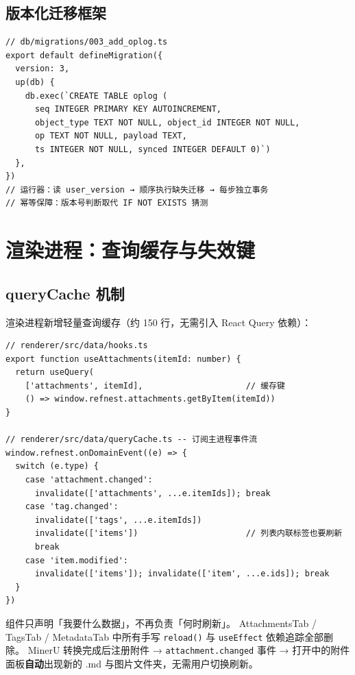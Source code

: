 \documentclass[12pt, a4paper]{article}
\begin{document}
\subsection{版本化迁移框架}

\begin{lstlisting}[language={}]
// db/migrations/003_add_oplog.ts
export default defineMigration({
  version: 3,
  up(db) {
    db.exec(`CREATE TABLE oplog (
      seq INTEGER PRIMARY KEY AUTOINCREMENT,
      object_type TEXT NOT NULL, object_id INTEGER NOT NULL,
      op TEXT NOT NULL, payload TEXT,
      ts INTEGER NOT NULL, synced INTEGER DEFAULT 0)`)
  },
})
// 运行器：读 user_version → 顺序执行缺失迁移 → 每步独立事务
// 幂等保障：版本号判断取代 IF NOT EXISTS 猜测
\end{lstlisting}

\section{渲染进程：查询缓存与失效键}

\subsection{queryCache 机制}

渲染进程新增轻量查询缓存（约 150 行，无需引入 React Query 依赖）：

\begin{lstlisting}[language={}]
// renderer/src/data/hooks.ts
export function useAttachments(itemId: number) {
  return useQuery(
    ['attachments', itemId],                     // 缓存键
    () => window.refnest.attachments.getByItem(itemId))
}

// renderer/src/data/queryCache.ts -- 订阅主进程事件流
window.refnest.onDomainEvent((e) => {
  switch (e.type) {
    case 'attachment.changed':
      invalidate(['attachments', ...e.itemIds]); break
    case 'tag.changed':
      invalidate(['tags', ...e.itemIds])
      invalidate(['items'])                      // 列表内联标签也要刷新
      break
    case 'item.modified':
      invalidate(['items']); invalidate(['item', ...e.ids]); break
  }
})
\end{lstlisting}

\begin{tcolorbox}[fixbox, title={对策 \#2：解决「各组件手动 reload」}]
  组件只声明「我要什么数据」，不再负责「何时刷新」。
  AttachmentsTab / TagsTab / MetadataTab 中所有手写 \texttt{reload()}
  与 \texttt{useEffect} 依赖追踪全部删除。
  MinerU 转换完成后注册附件 → \texttt{attachment.changed} 事件 →
  打开中的附件面板\textbf{自动}出现新的 .md 与图片文件夹，无需用户切换刷新。
\end{tcolorbox}
\end{document}
